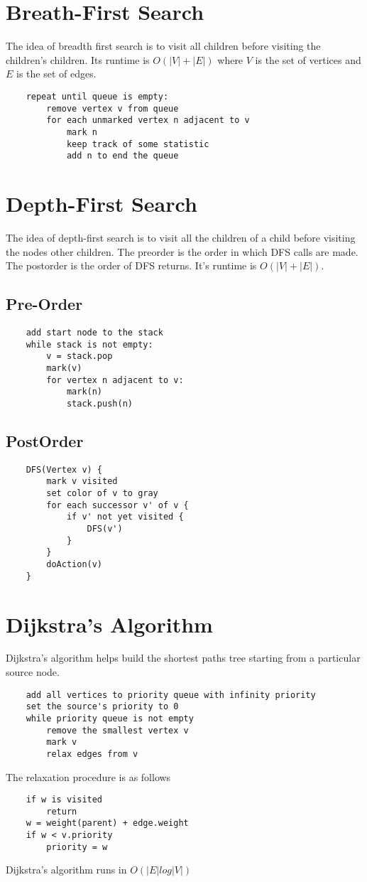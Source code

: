 \documentclass{article}
\begin{document}
\section{Breath-First Search}
The idea of breadth first search is to visit all children before visiting the children's children.
Its runtime is $O(|V|+|E|)$ where $V$ is the set of vertices and $E$ is the set of edges.
\begin{lstlisting}
    repeat until queue is empty:
        remove vertex v from queue
        for each unmarked vertex n adjacent to v
            mark n
            keep track of some statistic
            add n to end the queue
\end{lstlisting}
\section{Depth-First Search}
The idea of depth-first search is to visit all the children of a child before visiting the nodes other children.
The preorder is the order in which DFS calls are made. The postorder is the order of DFS returns.
It's runtime is $O(|V|+|E|)$.
\subsection{Pre-Order}
\begin{lstlisting}
    add start node to the stack
    while stack is not empty:
        v = stack.pop
        mark(v)
        for vertex n adjacent to v:
            mark(n)
            stack.push(n)
\end{lstlisting}
\subsection{PostOrder}
\begin{lstlisting}
    DFS(Vertex v) {
        mark v visited
        set color of v to gray
        for each successor v' of v {
	        if v' not yet visited {
	            DFS(v')
	        }
        }
        doAction(v)
    }
\end{lstlisting}
\section{Dijkstra's Algorithm}
Dijkstra's algorithm helps build the shortest paths tree starting from a particular source node.
\begin{lstlisting}
    add all vertices to priority queue with infinity priority
    set the source's priority to 0
    while priority queue is not empty
        remove the smallest vertex v
        mark v 
        relax edges from v
\end{lstlisting}
The relaxation procedure is as follows
\begin{lstlisting}
    if w is visited
        return
    w = weight(parent) + edge.weight
    if w < v.priority
        priority = w
\end{lstlisting}
Dijkstra's algorithm runs in $O(|E|log|V|)$
\end{document}

